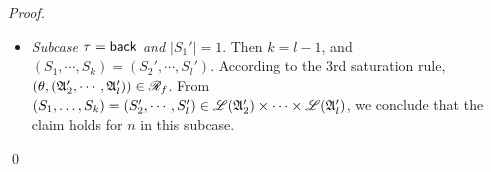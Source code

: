 \begin{proof}
{\begin{itemize}
\begin{itemize}
$$\begin{array}{l}
            \end{array}
            $$  
            we conclude that the claim holds for $n$ in this subcase. 
            \item if $S_i' \in \Lang(\Aut_i') = \Lang(\Aut_{A_0\stackrel{C}\rightsquigarrow D})$ for some $C\in\Gamma_{A_0}\setminus\{A_0'\}$, $D\in\Gamma_{A_0}$, moreover $B' = A_0'$, $S_i' = S\cdot [A_0]\cdot S'$ for some $S,S'\in\Gamma_{A_0}^*$ with $A_0'\notin S$, $S_1' \in \Lang(\Aut_{A\rightsquigarrow B})$ for some $A\in\act_\STK\cup\act_\SIT$, $S_1 = [A_0]\cdot S'$, $(S_2, \dots, S_k) = (S'_1, \dots, S'_{i-1}, S'_{i+1}, \dots, S'_l)$. According to the 2nd saturation rule, we know that 
            $$(\theta, (\Aut_{A_0\stackrel{C}\rightsquigarrow A_0'}, \Aut_1',\cdots, \Aut_{i-1}', \Aut_{i+1}', \cdots, \Aut_{l}')) \in \AutReach_f.$$
            From 
            $\Lang(\Aut_{A_0\stackrel{C}\rightsquigarrow A_0'}) = \{[A_0']\cdot S\mid S'\cdot[A_0']\cdot S\in\Lang(\Aut_{A_0\stackrel{C}\rightsquigarrow D})\}$,
            we know that $[A_0']\cdot S'\in\Lang(\Aut_{A_0\stackrel{C}\rightsquigarrow A_0'})$. From
            $$
            \begin{array}{l}
                (S_1,\cdots,S_k) = ([A_0']\cdot S', S_1', \cdots, S_{i-1}', S_{i+1}', \cdots, S_l') \in \\
                \ \ \Lang(\Aut_{A_0\stackrel{C}\rightsquigarrow A_0'}) \times \Lang(\Aut_1') \times \cdots \times \Lang(\Aut_{i-1}') \times \Lang(\Aut_{i+1}')\times \cdots \times \Lang(\Aut_{l}'),
            \end{array}
            $$  
            we conclude that the claim holds for $n$ in this subcase. 
        \end{itemize}
        \item \emph{Subcase $\tau = {\mathsf{back} }$ and $|S_1'|=1$}. Then $k = l - 1$, and $(S_1,\cdots,S_k) = (S_2',\cdots,S_l')$.  According to the 3rd saturation rule, $(\theta, ({\mathfrak{A} }_2',\cdots,{\mathfrak{A} }_l')) \in \mathscr{R}_f$. From $(S_1,\dots,S_k) = (S'_2, \cdots, S'_l) \in {\mathscr{L} }({\mathfrak{A} }_2') \times \cdots \times {\mathscr{L} }({\mathfrak{A} }_l')$, we conclude that the claim holds for $n$ in this subcase. 
    \end{itemize}
}
%
\qed
    \end{proof}


